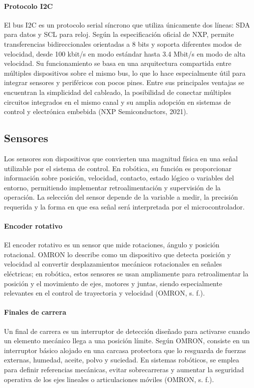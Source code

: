 \paragraph{Protocolo I2C}
El bus I2C es un protocolo serial síncrono que utiliza únicamente dos líneas: SDA para datos y SCL para reloj. Según la especificación oficial de NXP, permite transferencias bidireccionales orientadas a 8 bits y soporta diferentes modos de velocidad, desde 100 kbit/s en modo estándar hasta 3.4 Mbit/s en modo de alta velocidad. Su funcionamiento se basa en una arquitectura compartida entre múltiples dispositivos sobre el mismo bus, lo que lo hace especialmente útil para integrar sensores y periféricos con pocos pines. Entre sus principales ventajas se encuentran la simplicidad del cableado, la posibilidad de conectar múltiples circuitos integrados en el mismo canal y su amplia adopción en sistemas de control y electrónica embebida (NXP Semiconductors, 2021).

\subsection{Sensores}
Los sensores son dispositivos que convierten una magnitud física en una señal utilizable por el sistema de control. En robótica, su función es proporcionar información sobre posición, velocidad, contacto, estado lógico o variables del entorno, permitiendo implementar retroalimentación y supervisión de la operación. La selección del sensor depende de la variable a medir, la precisión requerida y la forma en que esa señal será interpretada por el microcontrolador.

\paragraph{Encoder rotativo} El encoder rotativo es un sensor que mide rotaciones, ángulo y posición rotacional. OMRON lo describe como un dispositivo que detecta posición y velocidad al convertir desplazamientos mecánicos rotacionales en señales eléctricas; en robótica, estos sensores se usan ampliamente para retroalimentar la posición y el movimiento de ejes, motores y juntas, siendo especialmente relevantes en el control de trayectoria y velocidad (OMRON, s. f.).

\paragraph{Finales de carrera} Un final de carrera es un interruptor de detección diseñado para activarse cuando un elemento mecánico llega a una posición límite. Según OMRON, consiste en un interruptor básico alojado en una carcasa protectora que lo resguarda de fuerzas externas, humedad, aceite, polvo y suciedad. En sistemas robóticos, se emplea para definir referencias mecánicas, evitar sobrecarreras y aumentar la seguridad operativa de los ejes lineales o articulaciones móviles (OMRON, s. f.).

